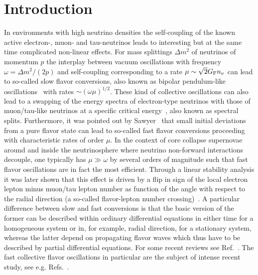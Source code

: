 \documentclass[prd,aps]{revtex4-2}
\begin{document}
\section{Introduction}
In environments with high neutrino densities the self-coupling of the known active electron-, muon- and tau-neutrinos leads
to interesting but at the same time complicated non-linear effects. For mass splittings $\Delta m^2$ of neutrinos of momentum
$p$ the interplay between vacuum oscillations with frequency $\omega=\Delta m^2/(2p)$
and self-coupling corresponding to a rate $\mu\sim \sqrt2 G_{\rm F}n_\nu$ can lead to so-called slow flavor
conversions, also known as bipolar pendulum-like oscillations~\cite{Hannestad:2006nj,Duan:2005cp} with rates $\sim(\omega\mu)^{1/2}$.
These kind of collective oscillations can also lead to a swapping of the energy spectra of electron-type neutrinos with
those of muon/tau-like neutrinos at a specific critical energy~\cite{Raffelt:2007xt,Raffelt:2007cb,Duan:2007bt,Fogli:2007bk,Martin:2019dof},
also known as spectral splits. Furthermore, it was pointed out by 
Sawyer~\cite{Sawyer:2005jk,Sawyer:2008zs} that small initial deviations from a pure flavor state can lead to so-called
fast flavor conversions proceeding with characteristic rates of order $\mu$. In the context of core collapse supernovae
around and inside the neutrinosphere where neutrino non-forward interactions decouple, one
typically has $\mu\gg\omega$ by several orders of magnitude such that fast flavor oscillations are in fact the most
efficient. Through a linear stability analysis it was later shown that this effect is driven by a flip in sign of the local
electron lepton minus muon/tau lepton number as function of the angle with respect to the radial direction (a so-called
flavor-lepton number crossing)~\cite{Izaguirre:2016gsx,Capozzi:2017gqd,Airen:2018nvp}. A particular difference between slow and
fast conversions is that
the basic version of the former can be described within ordinary differential equations in either time for a homogeneous system or in,
for example, radial direction, for a stationary system, whereas the latter depend on propagating flavor waves which thus
have to be described by partial differential equations. For some recent reviews see 
Ref.~\cite{Duan:2010bg,Chakraborty:2016yeg,Tamborra:2020cul}. The fast collective flavor oscillations in particular
are the subject of intense recent study, see e.g. Refs.~\cite{Martin:2019gxb,Bhattacharyya:2020jpj,Abbar:2019zoq,Abbar:2020ror}.
\end{document}
